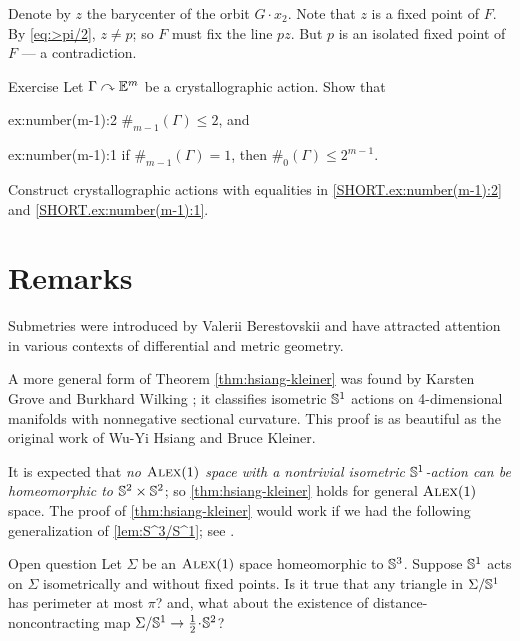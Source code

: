 Denote by $z$ the barycenter of the orbit $G\cdot x_2$.
Note that $z$ is a fixed point of $F$.
By \ref{eq:>pi/2}, $z\ne p$;
so $F$ must fix the line $pz$.
But $p$ is an isolated fixed point of $F$ --- a contradiction.
\qeds

\begin{thm}{Exercise}\label{ex:number(m-1)}
Let $\Gamma\curvearrowright \mathbb{E}^m$ be a crystallographic action.
Show that
\begin{subthm}{ex:number(m-1):2}
$\#_{m-1}(\Gamma)\le 2$, and
\end{subthm}

\begin{subthm}{ex:number(m-1):1}
if $\#_{m-1}(\Gamma)=1$, then $\#_0(\Gamma)\le 2^{m-1}$.
\end{subthm}

Construct  crystallographic actions with equalities in \ref{SHORT.ex:number(m-1):2} and \ref{SHORT.ex:number(m-1):1}.
\end{thm}

\section{Remarks}

Submetries were introduced by Valerii Berestovskii \cite{berestovskii1987} and have attracted attention in various contexts of differential and metric geometry.



A more general form of Theorem \ref{thm:hsiang-kleiner} was found by Karsten Grove and Burkhard Wilking \cite{grove-wilking};
it classifies isometric $\mathbb{S}^1$ actions on  4-dimensional manifolds with nonnegative sectional curvature.
This proof is as beautiful as the original work of Wu-Yi Hsiang and Bruce Kleiner.

It is expected that \textit{no $\textsc{Alex}(1)$ space with a nontrivial isometric $\mathbb{S}^1$-action can be homeomorphic to $\mathbb{S}^2\times\mathbb{S}^2$};
so \ref{thm:hsiang-kleiner} holds for general $\textsc{Alex}(1)$ space.
The proof of \ref{thm:hsiang-kleiner} would work if we had the following generalization of \ref{lem:S^3/S^1};
see \cite{harvey-searle}.

\begin{thm}{Open question}
Let $\Sigma$ be an $\textsc{Alex}(1)$ space homeomorphic to $\mathbb{S}^3$.
Suppose $\mathbb{S}^1$ acts on $\Sigma$ isometrically and without fixed points.
Is it true that any triangle in $\Sigma/\mathbb{S}^1$ has perimeter at most $\pi$?
and, what about the existence of distance-noncontracting map $\Sigma/\SSS^1\to \tfrac12\cdot\SSS^2$?
\end{thm}


